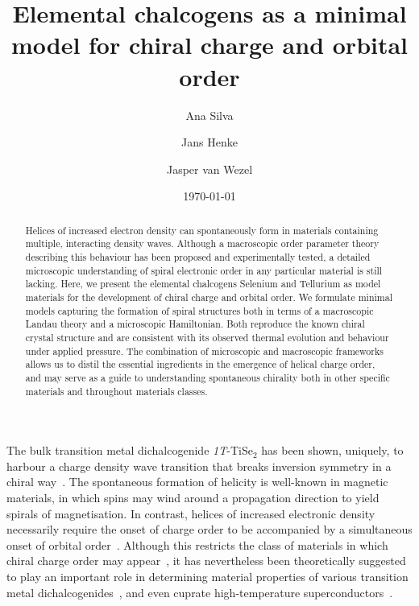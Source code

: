\documentclass[aps,prl,twocolumn,superscriptaddress,groupedaddress]{revtex4}
\begin{document}
\title{Elemental chalcogens as a minimal model for chiral charge and orbital order}

\author{Ana Silva}
\author{Jans Henke}
\author{Jasper van Wezel}

\date{\today}


\begin{abstract}
Helices of increased electron density can spontaneously form in materials containing multiple, interacting density waves. Although a macroscopic order parameter theory describing this behaviour has been proposed and experimentally tested, a detailed microscopic understanding of spiral electronic order in any particular material is still lacking. Here, we present the elemental chalcogens Selenium and Tellurium as model materials for the development of chiral charge and orbital order. We formulate minimal models capturing the formation of spiral structures both in terms of a macroscopic Landau theory and a microscopic Hamiltonian. Both reproduce the known chiral crystal structure and are consistent with its observed thermal evolution and behaviour under applied pressure. The combination of microscopic and macroscopic frameworks allows us to distil the essential ingredients in the emergence of helical charge order, and may serve as a guide to understanding spontaneous chirality both in other specific materials and throughout materials classes.
\end{abstract}

\maketitle


The bulk transition metal dichalcogenide \emph{1T}-TiSe$_2$ has been shown, uniquely, to harbour a charge density wave transition that breaks inversion symmetry in a chiral way~\cite{ishioka,vanwezellittlewood,vanwezel,castellan,iavarone}. The spontaneous formation of helicity is well-known in magnetic materials, in which spins may wind around a propagation direction to yield spirals of magnetisation. In contrast, helices of increased electronic density necessarily require the onset of charge order to be accompanied by a simultaneous onset of orbital order~\cite{vanwezel,fukutome,fukutome2}. Although this restricts the class of materials in which chiral charge order may appear~\cite{prerequisites}, it has nevertheless been theoretically suggested to play an important role in determining material properties of various transition metal dichalcogenides~\cite{prerequisites,TaS2spain,TaS2vanwezel}, and even cuprate high-temperature superconductors~\cite{Raghu,Raghu2,Gradhand}.
\end{document}
